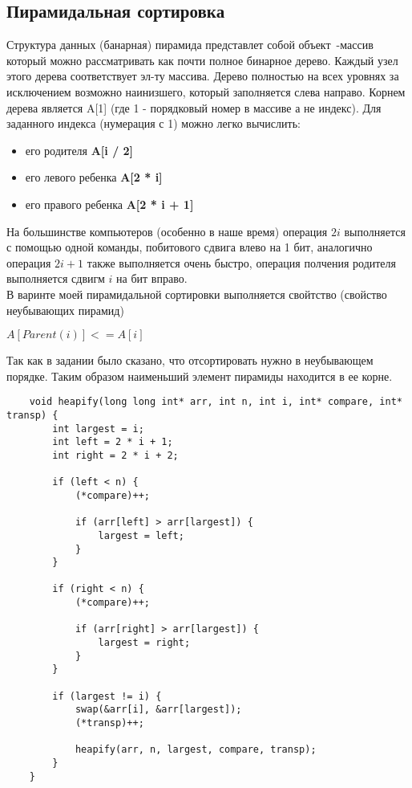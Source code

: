 \documentclass[a4paper,12pt,titlepage,finall]{article}
\begin{document}
\newpage

\subsection{Пирамидальная сортировка}

Структура данных (банарная) пирамида представлет
собой объект~-массив который можно рассматривать как почти полное бинарное дерево.
Каждый узел этого дерева соответствует эл-ту массива. Дерево полностью на всех уровнях 
за исключением возможно наинизшего, который заполняется слева направо.
Корнем дерева является A[1] (где 1 - порядковый номер в массиве а не индекс). Для заданного 
индекса (нумерация с 1) можно легко вычислить:
\begin{itemize}
    \item его родителя \textbf{A[i / 2]}
    \item его левого ребенка \textbf{A[2 * i]}
    \item его правого ребенка \textbf{A[2 * i + 1]}
\end{itemize}

На большинстве компьютеров (особенно в наше время) операция $2i$ выполняется с помощью одной
команды, побитового сдвига влево на 1 бит, аналогично 
операция $2i + 1$ также выполняется очень быстро, операция полчения родителя выполняется
сдвигм $i$ на бит вправо.\\
В варинте моей пирамидальной сортировки выполняется свойтство (свойство неубывающих пирамид) \\
\begin{center}
    $A[Parent(i)] <= A[i]$
\end{center}

Так как в задании было сказано, что отсортировать нужно в неубывающем порядке.
Таким образом наименьший элемент пирамиды находится в ее корне.

\begin{verbatim}
    void heapify(long long int* arr, int n, int i, int* compare, int* transp) {
        int largest = i;
        int left = 2 * i + 1;
        int right = 2 * i + 2;

        if (left < n) {
            (*compare)++;

            if (arr[left] > arr[largest]) {
                largest = left;
            }
        }

        if (right < n) {
            (*compare)++;

            if (arr[right] > arr[largest]) {
                largest = right;
            }
        }

        if (largest != i) {
            swap(&arr[i], &arr[largest]);
            (*transp)++;

            heapify(arr, n, largest, compare, transp);
        }
    }    
\end{verbatim}
\end{document}
